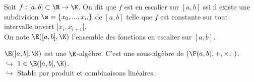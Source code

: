 \documentclass[11pt]{article}
\begin{document}
\begin{rappel}{}{}
    Soit $f:[a,b]\subset\R\to\K$. On dit que $f$ est en escalier sur $[a,b]$ ssi il existe une subdivision $\s=\{x_0,...,x_n\}$ de $[a,b]$ telle que $f$ est constante sur tout intervalle ouvert $]x_i,x_{i+1}[$.\\
    On note $\E([a,b],\K)$ l'ensemble des fonctions en escalier sur $[a,b]$.
\end{rappel}

\vspace*{-0.4cm}

\begin{prop}{}{}
    $\E([a,b],\K)$ est une $\K$-algèbre.
    \tcblower
    C'est une sous-algèbre de $(\F(a,b),+,\times,\cdot)$.\\
    $\hookrightarrow$ $1\in\E([a,b],\K)$.\\
    $\hookrightarrow$ Stable par produit et combinaisons linéaires.
\end{prop}

\pagebreak
\end{document}
